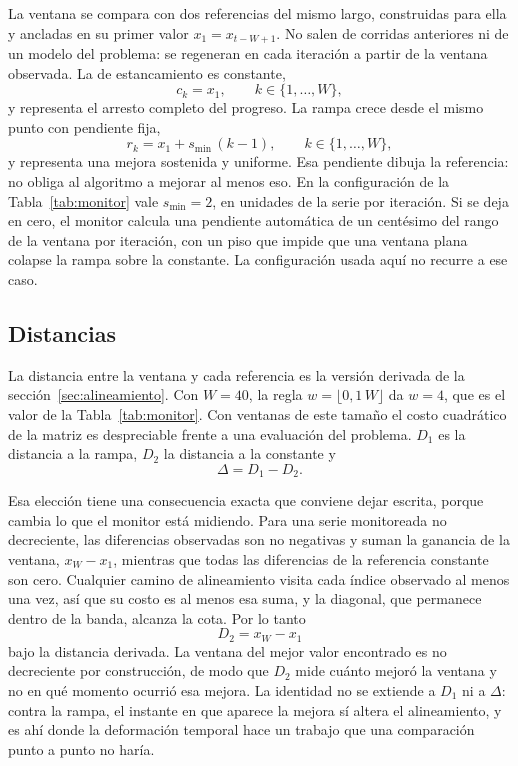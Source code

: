 \documentclass[runningheads]{llncs}
\begin{document}
La ventana se compara con dos referencias del mismo largo, construidas para ella y ancladas en su primer valor $x_1 = x_{t-W+1}$. No salen de corridas anteriores ni de un modelo del problema: se regeneran en cada iteración a partir de la ventana observada. La de estancamiento es constante,
\begin{equation}
c_k = x_1, \qquad k \in \{1, \ldots, W\},
\label{eq:constante}
\end{equation}
y representa el arresto completo del progreso. La rampa crece desde el mismo punto con pendiente fija,
\begin{equation}
r_k = x_1 + s_{\min}\,(k-1), \qquad k \in \{1, \ldots, W\},
\label{eq:rampa}
\end{equation}
y representa una mejora sostenida y uniforme. Esa pendiente dibuja la referencia: no obliga al algoritmo a mejorar al menos eso. En la configuración de la Tabla~\ref{tab:monitor} vale $s_{\min} = 2$, en unidades de la serie por iteración. Si se deja en cero, el monitor calcula una pendiente automática de un centésimo del rango de la ventana por iteración, con un piso que impide que una ventana plana colapse la rampa sobre la constante. La configuración usada aquí no recurre a ese caso.

\subsection{Distancias}
\label{sec:distancias}

La distancia entre la ventana y cada referencia es la versión derivada de la sección~\ref{sec:alineamiento}. Con $W = 40$, la regla $w = \lfloor 0{,}1\,W \rfloor$ da $w = 4$, que es el valor de la Tabla~\ref{tab:monitor}. Con ventanas de este tamaño el costo cuadrático de la matriz es despreciable frente a una evaluación del problema. $D_1$ es la distancia a la rampa, $D_2$ la distancia a la constante y
\begin{equation}
\Delta = D_1 - D_2.
\label{eq:delta}
\end{equation}

Esa elección tiene una consecuencia exacta que conviene dejar escrita, porque cambia lo que el monitor está midiendo. Para una serie monitoreada no decreciente, las diferencias observadas son no negativas y suman la ganancia de la ventana, $x_W - x_1$, mientras que todas las diferencias de la referencia constante son cero. Cualquier camino de alineamiento visita cada índice observado al menos una vez, así que su costo es al menos esa suma, y la diagonal, que permanece dentro de la banda, alcanza la cota. Por lo tanto
\begin{equation}
D_2 = x_W - x_1
\label{eq:ganancia}
\end{equation}
bajo la distancia derivada. La ventana del mejor valor encontrado es no decreciente por construcción, de modo que $D_2$ mide cuánto mejoró la ventana y no en qué momento ocurrió esa mejora. La identidad no se extiende a $D_1$ ni a $\Delta$: contra la rampa, el instante en que aparece la mejora sí altera el alineamiento, y es ahí donde la deformación temporal hace un trabajo que una comparación punto a punto no haría.
\end{document}
